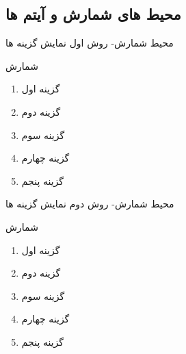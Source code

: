\documentclass[xcolor=svgnames,10pt]{beamer}
\begin{document}
\subsection{محیط های شمارش و آیتم ها}
\begin{frame}[t]{محیط شمارش- روش اول نمایش گزینه ها}
\begin{block}{شمارش}
    \begin{enumerate}
        \item گزینه اول \pause
        \item گزینه دوم \pause
        \item گزینه سوم \pause
        \item گزینه چهارم \pause
        \item گزینه پنجم \pause
    \end{enumerate}   
\end{block}	
\end{frame}
\begin{frame}[t]{محیط شمارش- روش دوم نمایش گزینه ها}
\begin{block}{شمارش}
    \begin{enumerate}[<+->]
        \item گزینه اول 
        \item گزینه دوم 
        \item گزینه سوم 
        \item گزینه چهارم 
        \item گزینه پنجم 
    \end{enumerate}   
\end{block}	
\end{frame}
\end{document}

